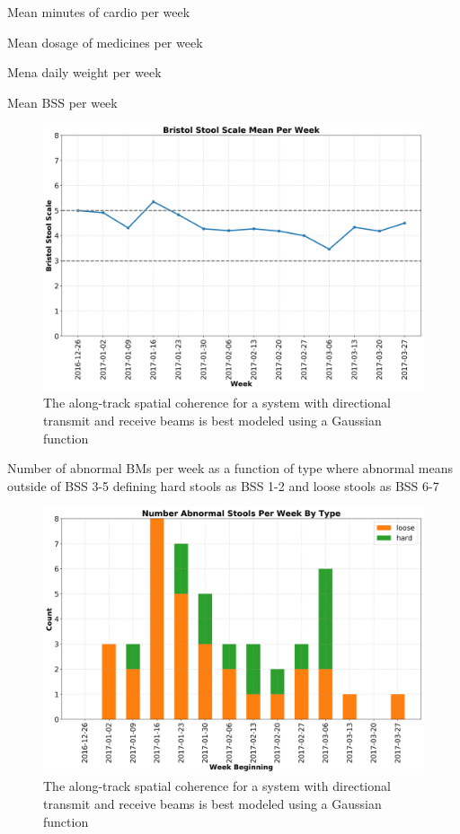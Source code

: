 \documentclass[conference]{IEEEtran}
\begin{document}
Mean minutes of cardio per week

Mean dosage of medicines per week

Mena daily weight per week

Mean BSS per week
\begin{figure}[t]
    \centering
    \includegraphics[width=\columnwidth]{bss_mean.png}
    \caption{The along-track spatial coherence for a system with directional transmit and receive beams is best modeled using a Gaussian function}\label{fig:mean_bss}
\end{figure}

Number of abnormal BMs per week as a function of type where abnormal means outside of BSS 3-5 defining hard stools as BSS 1-2 and loose stools as BSS 6-7

\begin{figure}[t]
    \centering
    \includegraphics[width=\columnwidth]{abnormal.png}
    \caption{The along-track spatial coherence for a system with directional transmit and receive beams is best modeled using a Gaussian function}\label{fig:abnormal_bss}
\end{figure}
\end{document}
